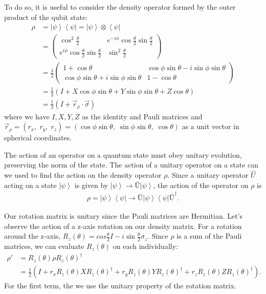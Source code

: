 \documentclass[11pt]{article} %
\newcommand{\bra}[1]{\left\langle #1 \right|}
\newcommand{\ket}[1]{\left|#1\right\rangle}
\begin{document}
To do so, it is useful to consider the density operator formed by the outer product of the qubit state:
\begin{align}
    \rho &= \ket{\psi}\bra{\psi} = \ket{\psi}\otimes\bra{\psi}\\
    &=
        \begin{pmatrix}
            \cos^2\frac{\theta}{2} & e^{-i\phi}\cos\frac{\theta}{2}\sin\frac{\theta}{2} \\
            e^{i\phi}\cos\frac{\theta}{2}\sin\frac{\theta}{2} & \sin^2\frac{\theta}{2}
        \end{pmatrix}\nonumber\\
    &= \frac{1}{2}
        \begin{pmatrix}
            1+\cos\theta & \cos\phi\sin\theta - i\sin\phi\sin\theta \\
            \cos\phi\sin\theta + i\sin\phi\sin\theta & 1-\cos\theta
        \end{pmatrix}\\
    &= \frac{1}{2}\left(I+X\cos\phi\sin\theta + Y\sin\phi\sin\theta+Z\cos\theta\right)\\
    &= \frac{1}{2}\left(I+\vec{r}_\rho\cdot\vec{\sigma}\right)
\end{align}
where we have $I, X, Y, Z$ as the identity and Pauli matrices and $\vec{r}_\rho = (r_x,\;r_y,\;r_z) = (\cos\phi\sin\theta,\;\sin\phi\sin\theta,\;\cos\theta)$ as a unit vector in spherical coordinates.

The action of an operator on a quantum state must obey unitary evolution, preserving the norm of the state. The action of a unitary operator on a state can we used to find the action on the density operator $\rho$. Since a unitary operator $\hat{U}$ acting on a state $\ket{\psi}$ is given by $\ket{\psi} \rightarrow \textrm{\^U}\ket{\psi}$, the action of the operator on $\rho$ is
\begin{align}
    \rho = \ket{\psi}\bra{\psi} \rightarrow \textrm{\^U}\ket{\psi}\bra{\psi}\textrm{\^U}^\dagger.
\end{align}

Our rotation matrix is unitary since the Pauli matrices are Hermitian. Let's observe the action of a z-axis rotation on our density matrix. For a rotation around the z-axis, $R_z(\theta) = cos\frac{\theta}{2}I-i\sin\frac{\theta}{2}\sigma_z$. Since $\rho$ is a sum of the Pauli matrices, we can evaluate $R_z(\theta)$ on each individually:
\begin{align}
    \rho' &= R_z(\theta)\rho R_z(\theta)^\dagger\\
    &= \frac{1}{2}\left(I+r_x R_z(\theta)X R_z(\theta)^\dagger +r_y R_z(\theta)Y R_z(\theta)^\dagger + r_z R_z(\theta)Z R_z(\theta)^\dagger\right).
\end{align}
For the first term, the we use the unitary property of the rotation matrix.
\end{document}
